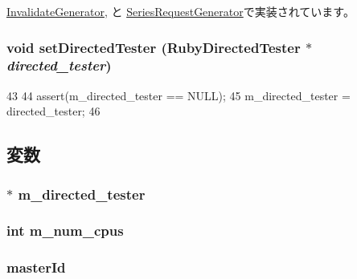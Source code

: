 \hyperlink{classInvalidateGenerator_a8c30329193052bf044bac8ee3e075475}{InvalidateGenerator}, と \hyperlink{classSeriesRequestGenerator_a8c30329193052bf044bac8ee3e075475}{SeriesRequestGenerator}で実装されています。\hypertarget{classDirectedGenerator_a15c714f94db09a1d209a3e72bb023bf3}{
\subsubsection[{setDirectedTester}]{\setlength{\rightskip}{0pt plus 5cm}void setDirectedTester ({\bf RubyDirectedTester} $\ast$ {\em directed\_\-tester})}}
\label{classDirectedGenerator_a15c714f94db09a1d209a3e72bb023bf3}



\begin{DoxyCode}
43 {
44     assert(m_directed_tester == NULL);
45     m_directed_tester = directed_tester;
46 }
\end{DoxyCode}


\subsection{変数}
\hypertarget{classDirectedGenerator_a29e21ffbcddccebb0466d6e25b3149ca}{
\subsubsection[{m\_\-directed\_\-tester}]{$\ast$ {\bf m\_\-directed\_\-tester}}}
\label{classDirectedGenerator_a29e21ffbcddccebb0466d6e25b3149ca}
\hypertarget{classDirectedGenerator_a696a7ada843596770ab04a749b5ffd67}{
\subsubsection[{m\_\-num\_\-cpus}]{\setlength{\rightskip}{0pt plus 5cm}int {\bf m\_\-num\_\-cpus}}}
\label{classDirectedGenerator_a696a7ada843596770ab04a749b5ffd67}
\hypertarget{classDirectedGenerator_a96ec6a422ac492d05f8b3edc5b58532b}{
\subsubsection[{masterId}]{ {\bf masterId}}}
\label{classDirectedGenerator_a96ec6a422ac492d05f8b3edc5b58532b}



